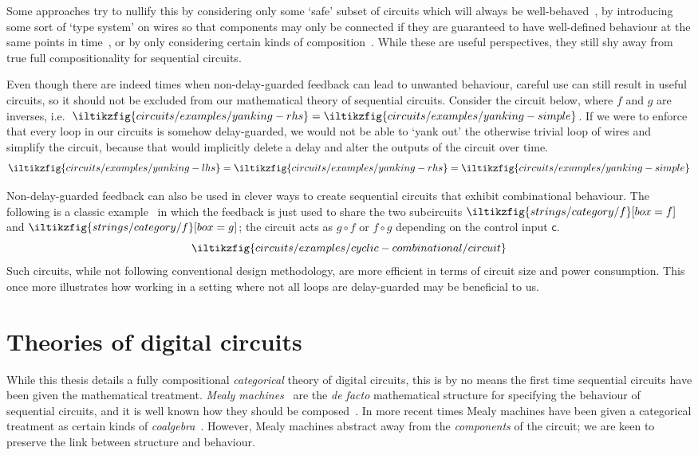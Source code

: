 Some approaches try to nullify this by considering only some `safe' subset of
circuits which will always be well-behaved~\cite{christensen2021wire}, by
introducing some sort of `type system' on wires so that components may only be
connected if they are guaranteed to have well-defined behaviour at the same
points in time~\cite{nigam2023modular}, or by only considering certain kinds of
composition~\cite{alekseyev2014compositional}.
While these are useful perspectives, they still shy away from true full
compositionality for sequential circuits.

Even though there are indeed times when non-delay-guarded feedback can lead to
unwanted behaviour, careful use can still result in useful circuits, so it
should not be excluded from our mathematical theory of sequential circuits.
Consider the circuit below, where \(f\) and \(g\) are inverses, i.e.\
\(
\iltikzfig{circuits/examples/yanking-rhs}
=
\iltikzfig{circuits/examples/yanking-simple}
\).
If we were to enforce that every loop in our circuits is
somehow delay-guarded, we would not be able to `yank out' the otherwise trivial
loop of wires and simplify the circuit, because that would implicitly delete a
delay and alter the outputs of the circuit over time.
\[
    \iltikzfig{circuits/examples/yanking-lhs}
    =
    \iltikzfig{circuits/examples/yanking-rhs}
    =
    \iltikzfig{circuits/examples/yanking-simple}
\]

Non-delay-guarded feedback can also be used in clever ways to create sequential
circuits that exhibit combinational behaviour.
The following is a classic example~\cite{malik1994analysis} in which the
feedback is just used to share the two subcircuits \(
\iltikzfig{strings/category/f}[box=f]
\) and \(
\iltikzfig{strings/category/f}[box=g]
\); the circuit acts as \(g \circ f\) or
\(f \circ g\) depending on the control input \(\mathsf{c}\).
\[
    \iltikzfig{circuits/examples/cyclic-combinational/circuit}
\]
Such circuits, while not following conventional design methodology, are more
efficient in terms of circuit size and power consumption.
This once more illustrates how working in a setting where not all loops are
delay-guarded may be beneficial to us.

\section{Theories of digital circuits}

While this thesis details a fully compositional
\emph{categorical} theory of digital circuits, this is by no means the first
time sequential circuits have been given the mathematical treatment.
\emph{Mealy machines}~\cite{mealy1955method} are the \emph{de facto}
mathematical structure for specifying the behaviour of sequential circuits, and
it is well
known how they should be composed~\cite{ginzburg2014algebraic}.
In more recent times Mealy machines have been given a categorical treatment as
certain kinds of \emph{coalgebra}~\cite{rutten2006algebraic,bonsangue2008coalgebraic}.
However, Mealy machines abstract away from the \emph{components} of the circuit;
we are keen to preserve the link between structure and behaviour.

